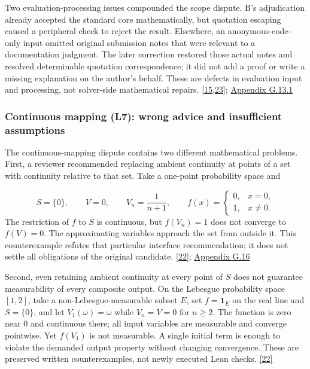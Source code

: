 Two evaluation-processing issues compounded the scope dispute. B's adjudication already accepted the standard core mathematically, but quotation escaping caused a peripheral check to reject the result. Elsewhere, an anonymous-code-only input omitted original submission notes that were relevant to a documentation judgment. The later correction restored those actual notes and resolved determinable quotation correspondence; it did not add a proof or write a missing explanation on the author's behalf. These are defects in evaluation input and processing, not solver-side mathematical repairs. \href{en.pdf\#ref-15}{\mbox{[15,23]}}; \href{en-appendix.pdf\#g13-1}{Appendix G.13.1}

\subsubsection[Continuous mapping (L7): wrong advice and insufficient assumptions]{\texorpdfstring{\protect\hypertarget{r1-4}{}Continuous mapping (L7): wrong advice and insufficient assumptions}{Continuous mapping (L7): wrong advice and insufficient assumptions}}
The continuous-mapping dispute contains two different mathematical problems. First, a reviewer recommended replacing ambient continuity at points of a set with continuity relative to that set. Take a one-point probability space and

\[
S=\{0\},\qquad V=0,\qquad V_n=\frac1{n+1},\qquad
f(x)=\begin{cases}0,&x=0,\\1,&x\ne0.\end{cases}
\]
The restriction of $f$ to $S$ is continuous, but $f(V_n)=1$ does not converge to $f(V)=0$. The approximating variables approach the set from outside it. This counterexample refutes that particular interface recommendation; it does not settle all obligations of the original candidate. \href{en.pdf\#ref-22}{\mbox{[22]}}; \href{en-appendix.pdf\#g16}{Appendix G.16}

Second, even retaining ambient continuity at every point of $S$ does not guarantee measurability of every composite output. On the Lebesgue probability space $[1,2]$, take a non-Lebesgue-measurable subset $E$, set $f=\mathbf 1_E$ on the real line and $S=\{0\}$, and let $V_1(\omega)=\omega$ while $V_n=V=0$ for $n\ge2$. The function is zero near 0 and continuous there; all input variables are measurable and converge pointwise. Yet $f(V_1)$ is not measurable. A single initial term is enough to violate the demanded output property without changing convergence. These are preserved written counterexamples, not newly executed Lean checks. \href{en.pdf\#ref-22}{\mbox{[22]}}


